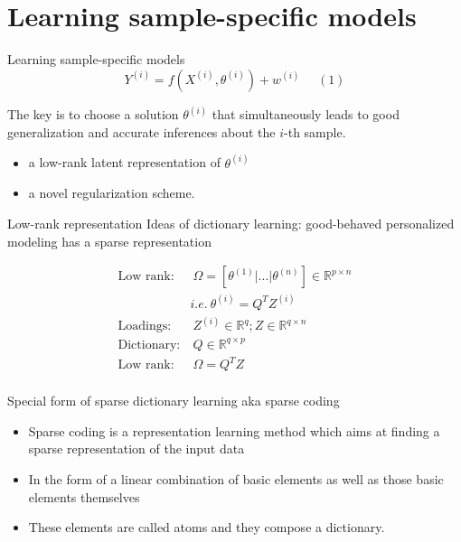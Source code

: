 \documentclass[
  10pt,
  ignorenonframetext,
]{beamer}
\providecommand{\tightlist}{%
  \setlength{\itemsep}{0pt}\setlength{\parskip}{0pt}}
\begin{document}
\hypertarget{learning-sample-specific-models}{%
\section{Learning sample-specific
models}\label{learning-sample-specific-models}}

\begin{frame}{Learning sample-specific models}
\[
Y^{(i)} = f(X^{(i)}, \theta^{(i)}) + w^{(i)} \ \ \ \ \ \ (1)
\]

The key is to choose a solution \(\theta^{(i)}\) that simultaneously
leads to good generalization and accurate inferences about the \(i\)-th
sample.

\begin{itemize}
\tightlist
\item
  a low-rank latent representation of \(\theta^{(i)}\)
\item
  a novel regularization scheme.
\end{itemize}
\end{frame}

\begin{frame}{Low-rank representation}
\protect\hypertarget{low-rank-representation}{}
Ideas of dictionary learning: good-behaved personalized modeling has a
sparse representation

\[
\begin{aligned}
\text {Low rank:} & \ \Omega = [\theta^{(1)} | ... | \theta^{(n)}] \in \mathbb R^{p \times n}\\
 & i.e.  \ \theta^{(i)}  = Q^T Z^{(i)}\\
\text {Loadings:}  & \ Z^{(i)} \in \mathbb R^q;   Z \in \mathbb R^{q \times n}\\
\text {Dictionary:}  & \  Q \in \mathbb R^{q\times p}\\
\text {Low rank:} & \ \Omega = Q^T Z\\
\end{aligned}
\]

\begin{block}{Special form of sparse dictionary learning aka sparse
coding}
\protect\hypertarget{special-form-of-sparse-dictionary-learning-aka-sparse-coding}{}
\begin{itemize}
\tightlist
\item
  Sparse coding is a representation learning method which aims at
  finding a sparse representation of the input data
\item
  In the form of a linear combination of basic elements as well as those
  basic elements themselves
\item
  These elements are called atoms and they compose a dictionary.
\end{itemize}
\end{block}
\end{frame}
\end{document}
